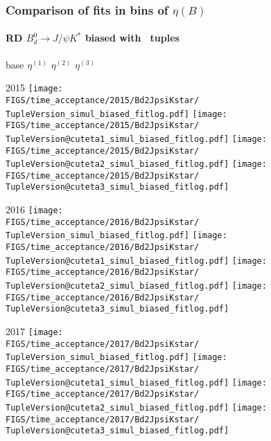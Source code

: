 \begin{frame} %
\frametitle{Comparison of fits in bins of $\eta(B)$}
\framesubtitle{RD $B_d^0\rightarrow J/\psi K^*$ biased with \TupleVersion\, tuples}

  \phantom{2020} base \hspace*{1.5cm} $\eta^{(1)}$ \hspace*{1.5cm} $\eta^{(2)}$ \hspace*{1.5cm} $\eta^{(3)}$

  2015
  \texttt{[image: \\FIGS/time\_acceptance/2015/Bd2JpsiKstar/\\TupleVersion\_simul\_biased\_fitlog.pdf]}
  \texttt{[image: \\FIGS/time\_acceptance/2015/Bd2JpsiKstar/\\TupleVersion@cuteta1\_simul\_biased\_fitlog.pdf]}
  \texttt{[image: \\FIGS/time\_acceptance/2015/Bd2JpsiKstar/\\TupleVersion@cuteta2\_simul\_biased\_fitlog.pdf]}
  \texttt{[image: \\FIGS/time\_acceptance/2015/Bd2JpsiKstar/\\TupleVersion@cuteta3\_simul\_biased\_fitlog.pdf]}
  \vspace*{2mm}

  2016
  \texttt{[image: \\FIGS/time\_acceptance/2016/Bd2JpsiKstar/\\TupleVersion\_simul\_biased\_fitlog.pdf]}
  \texttt{[image: \\FIGS/time\_acceptance/2016/Bd2JpsiKstar/\\TupleVersion@cuteta1\_simul\_biased\_fitlog.pdf]}
  \texttt{[image: \\FIGS/time\_acceptance/2016/Bd2JpsiKstar/\\TupleVersion@cuteta2\_simul\_biased\_fitlog.pdf]}
  \texttt{[image: \\FIGS/time\_acceptance/2016/Bd2JpsiKstar/\\TupleVersion@cuteta3\_simul\_biased\_fitlog.pdf]}
  \vspace*{2mm}

  2017
  \texttt{[image: \\FIGS/time\_acceptance/2017/Bd2JpsiKstar/\\TupleVersion\_simul\_biased\_fitlog.pdf]}
  \texttt{[image: \\FIGS/time\_acceptance/2017/Bd2JpsiKstar/\\TupleVersion@cuteta1\_simul\_biased\_fitlog.pdf]}
  \texttt{[image: \\FIGS/time\_acceptance/2017/Bd2JpsiKstar/\\TupleVersion@cuteta2\_simul\_biased\_fitlog.pdf]}
  \texttt{[image: \\FIGS/time\_acceptance/2017/Bd2JpsiKstar/\\TupleVersion@cuteta3\_simul\_biased\_fitlog.pdf]}
  \vspace*{2mm}


\end{frame}
